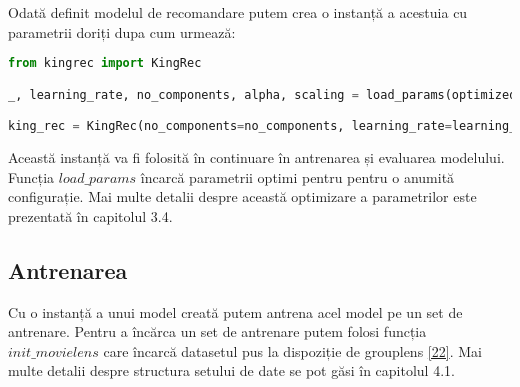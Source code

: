Odată definit modelul de recomandare putem crea o instanță a acestuia cu parametrii doriți dupa cum urmează:
\begin{lstlisting}[language=Python, caption=Instanțierea unui model]
from kingrec import KingRec

_, learning_rate, no_components, alpha, scaling = load_params(optimized_for='auc_clusters')

king_rec = KingRec(no_components=no_components, learning_rate=learning_rate, alpha=alpha, scale=scaling, loss='warp')
\end{lstlisting}
Această instanță va fi folosită în continuare în antrenarea și evaluarea modelului.
Funcția $load\_params$ încarcă parametrii optimi pentru pentru o anumită configurație. Mai multe detalii despre această optimizare a parametrilor este prezentată în capitolul 3.4.

\subsection{Antrenarea}
Cu o instanță a unui model creată putem antrena acel model pe un set de antrenare. Pentru a încărca un set de antrenare putem folosi funcția $init\_movielens$ care încarcă datasetul pus la dispoziție de grouplens \hyperlink{movielens}{[22]}. Mai multe detalii despre structura setului de date se pot găsi în capitolul 4.1.

